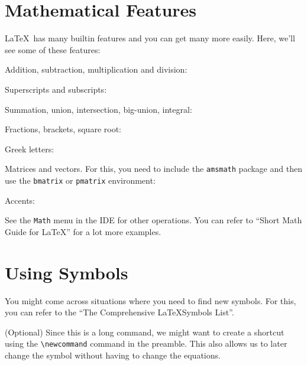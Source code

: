 \documentclass{article}
\begin{document}
\section{Mathematical Features}
\LaTeX\ has many builtin features and you can get many more easily. Here, we'll see some of these features: 

Addition, subtraction, multiplication and division: 


Superscripts and subscripts: 



Summation, union, intersection, big-union, integral: 



Fractions, brackets, square root: 


Greek letters: 



Matrices and vectors. For this, you need to include the \texttt{amsmath} package and then use the \texttt{bmatrix} or \texttt{pmatrix} environment: 



Accents: 



See the \texttt{Math} menu in the IDE for other operations. You can refer to ``Short Math Guide for \LaTeX'' for a lot more examples. 

\section{Using Symbols}
You might come across situations where you need to find new symbols. For this, you can refer to the ``The Comprehensive \LaTeX Symbols List''.  





(Optional) Since this is a long command, we might want to create a shortcut using the \verb|\newcommand| command in the preamble. This also allows us to later change the symbol without having to change the equations. 
\end{document}
